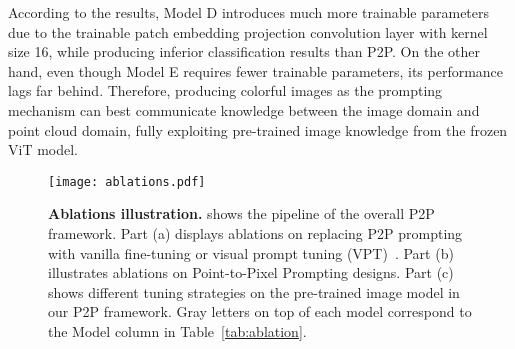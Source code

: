 \documentclass{article}
\begin{document}
According to the results, Model D introduces much more trainable parameters due to the trainable patch embedding projection convolution layer with kernel size 16, while producing inferior classification results than P2P. On the other hand, even though Model E requires fewer trainable parameters, its performance lags far behind. Therefore, producing colorful images as the prompting mechanism can best communicate knowledge between the image domain and point cloud domain, fully exploiting pre-trained image knowledge from the frozen ViT model.

\begin{figure*}[t]
	\centering
	\texttt{[image: ablations.pdf]}
	\caption{\small \textbf{Ablations illustration.}  shows the pipeline of the overall P2P framework. Part (a) displays ablations on replacing P2P prompting with vanilla fine-tuning or visual prompt tuning (VPT)~\cite{jia2022vpt}. Part (b) illustrates ablations on Point-to-Pixel Prompting designs. Part (c) shows different tuning strategies on the pre-trained image model in our P2P framework. Gray letters on top of each model correspond to the Model column in Table~\ref{tab:ablation}.}
	\label{fig:ablations}
\end{figure*}
\end{document}
